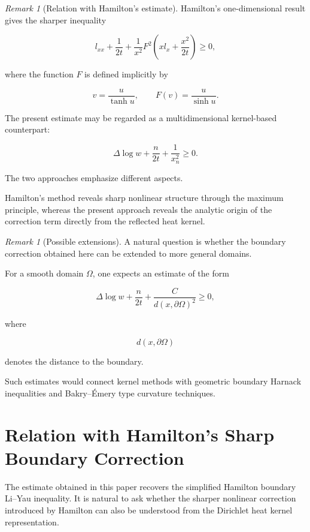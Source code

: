 \documentclass[11pt]{amsart}
\theoremstyle{definition}
\theoremstyle{remark}
\newtheorem{remark}[theorem]{Remark}
\begin{document}
\begin{remark}[Relation with Hamilton's estimate]

Hamilton's one-dimensional result gives the sharper inequality

\[
l_{xx}
+\frac1{2t}
+
\frac1{x^2}
F^2
\left(
xl_x+\frac{x^2}{2t}
\right)
\geq0,
\]

where the function $F$ is defined implicitly by

\[
v=\frac u{\tanh u},
\qquad
F(v)=\frac u{\sinh u}.
\]

The present estimate may be regarded as a multidimensional
kernel-based counterpart:

\[
\Delta\log w
+
\frac n{2t}
+
\frac1{x_n^2}
\geq0.
\]

The two approaches emphasize different aspects.

Hamilton's method reveals sharp nonlinear structure through the
maximum principle, whereas the present approach reveals the analytic
origin of the correction term directly from the reflected heat
kernel.

\end{remark}



\begin{remark}[Possible extensions]

A natural question is whether the boundary correction obtained here
can be extended to more general domains.

For a smooth domain $\Omega$, one expects an estimate of the form

\[
\Delta\log w
+
\frac n{2t}
+
\frac{C}{d(x,\partial\Omega)^2}
\geq0 ,
\]

where

\[
d(x,\partial\Omega)
\]

denotes the distance to the boundary.

Such estimates would connect kernel methods with geometric boundary
Harnack inequalities and Bakry--Émery type curvature techniques.

\end{remark}


\section{Relation with Hamilton's Sharp Boundary Correction}


The estimate obtained in this paper recovers the simplified
Hamilton boundary Li--Yau inequality. It is natural to ask whether
the sharper nonlinear correction introduced by Hamilton can also be
understood from the Dirichlet heat kernel representation.
\end{document}
